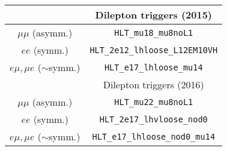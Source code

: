 \begin{table}[h!]
 \begin{center}
   \begin{tabular}{cc}
     \toprule
                  & Dilepton triggers (2015) \\
     \midrule
      $\mu\mu$ (asymm.)          & \verb!HLT_mu18_mu8noL1! \\
      $ee$ (symm.)               & \verb!HLT_2e12_lhloose_L12EM10VH! \\
      $e\mu,\mu e$ ($\sim$symm.) & \verb!HLT_e17_lhloose_mu14! \\
     \bottomrule
%
                  & Dilepton triggers (2016) \\
     \midrule
      $\mu\mu$ (asymm.)                   & \verb!HLT_mu22_mu8noL1! \\
      $ee$ (symm.)                        & \verb!HLT_2e17_lhvloose_nod0! \\
      $e\mu,\mu e$ ($\sim$symm.)          & \verb!HLT_e17_lhloose_nod0_mu14! \\
     \bottomrule

\end{tabular}
\end{center}
\end{table}
